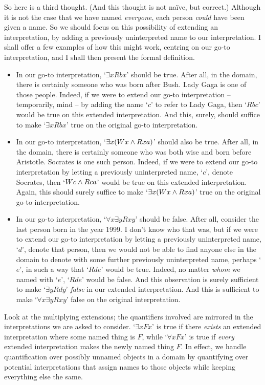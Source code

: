 So here is a third thought. (And this thought is not naïve, but correct.) Although it is not the case that we have named \emph{everyone}, each person \emph{could} have been given a name. So we should focus on this possibility of extending an interpretation, by adding a previously uninterpreted name to our interpretation. I shall offer a few examples of how this might work, centring on our go-to interpretation, and I shall then present the formal definition. 
\begin{itemize}
	\item In our go-to interpretation, `$\exists x Rbx$' should be true. After all, in the domain, there is certainly someone who was born after Bush. Lady Gaga is one of those people. Indeed, if we were to extend our go-to interpretation – temporarily, mind – by adding the name `$c$' to refer to Lady Gaga, then `$Rbc$' would be true on this extended interpretation. And this, surely, should suffice to make `$\exists x Rbx$' true on the original go-to interpretation. 
	\item In our go-to interpretation, `$\exists x (Wx \wedge Rxa)$' should also be true. After all, in the domain, there is certainly someone who was both wise and born before Aristotle. Socrates is one such person. Indeed, if we were to extend our go-to interpretation by letting a previously uninterpreted name, `$c$', denote Socrates, then `$Wc \wedge Rca$' would be true on this extended interpretation. Again, this should surely suffice to make `$\exists x (Wx \wedge Rxa)$' true on the original go-to interpretation. 
	\item In our go-to interpretation, `$\forall x \exists y Rxy$' should be false. After all, consider the last person born in the year 1999. I don't know who that was, but if we were to extend our go-to interpretation by letting a previously uninterpreted name, `$d$', denote that person, then we would not be able to find anyone else in the domain to denote with some further previously uninterpreted name, perhaps `$e$', in such a way that `$Rde$' would be true. Indeed, no matter \emph{whom} we named with `$e$', `$Rde$' would be false. And this observation is surely sufficient to make `$\exists y Rdy$' \emph{false} in our extended interpretation. And this is sufficient to make `$\forall x \exists y Rxy$' false on the original interpretation.
\end{itemize} Look at the multiplying extensions; the quantifiers involved are mirrored in the interpretations we are asked to consider. `$\exists x Fx$' is true if there \emph{exists} an extended interpretation where some named thing is $F$, while `$\forall x Fx$' is true if \emph{every} extended interpretation makes the newly named thing $F$. In effect, we handle quantification over possibly unnamed objects in a domain by quantifying over potential interpretations that assign names to those objects while keeping everything else the same.  

